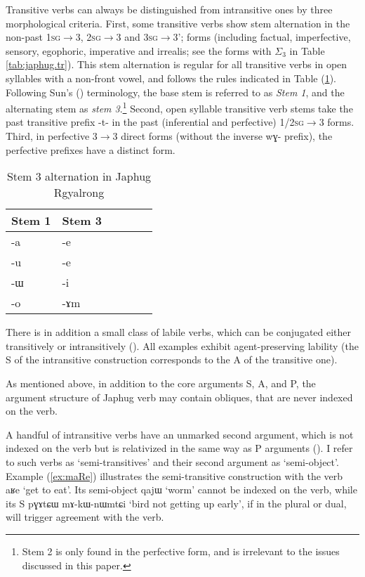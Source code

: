 \documentclass[oldfontcommands,oneside,a4paper,11pt]{article}
\newcommand{\ipa}[1]{{\phon \mbox{#1}}} %
\newcommand{\refb}[1]{(\ref{#1})}
\newcommand{\sigc}{$\Sigma_3$}
\begin{document}
Transitive verbs can always be distinguished from intransitive ones by three morphological criteria. First, some transitive verbs show stem alternation in the non-past \textsc{1sg}$\rightarrow$3, \textsc{2sg}$\rightarrow$3 and \textsc{3sg}$\rightarrow$3'; forms (including factual, imperfective, sensory, egophoric, imperative and irrealis; see the forms with \sigc{} in Table \ref{tab:japhug.tr}). This stem alternation is regular for all transitive verbs in open syllables with a non-front vowel, and follows the rules indicated  in Table \refb{tab:stem3}. Following Sun's (\citeyear{jackson00puxi}) terminology, the base stem is referred to as \textit{Stem 1}, and the alternating stem as \textit{stem 3}.\footnote{Stem 2 is only found in the perfective form, and is irrelevant to the issues discussed in this paper.}  Second, open syllable transitive verb stems take the past transitive prefix \ipa{-t-} in the past (inferential and perfective) \textsc{1/2sg}$\rightarrow$3 forms.  Third, in perfective 3$\rightarrow$3 direct forms (without the inverse \ipa{wɣ-} prefix), the perfective prefixes have a distinct form.

 \begin{table}[H]
\caption{Stem 3 alternation in Japhug Rgyalrong} \label{tab:stem3} \centering
\begin{tabular}{llllll}
\toprule
Stem 1 & Stem 3 \\
\midrule
\ipa{-a} & \ipa{-e} \\
\ipa{-u} & \ipa{-e} \\
\ipa{-ɯ} & \ipa{-i} \\
\ipa{-o} & \ipa{-ɤm} \\
\bottomrule
\end{tabular}
\end{table}

There is in addition a small class of labile verbs, which can be conjugated either transitively or intransitively (\citealt{jacques12demotion}). All examples exhibit agent-preserving  lability (the S of the intransitive construction corresponds to the A of the transitive one).
  
As mentioned above, in addition to the core arguments S, A, and P, the argument structure of Japhug verb may contain obliques, that are never indexed on the verb.
  
A handful of intransitive verbs have an unmarked second argument, which is not indexed on the verb but is relativized in the same way as P arguments (\citealt{jacques16relatives}). I refer to such verbs as `semi-transitives' and their second argument as `semi-object'.  Example \refb{ex:maRe} illustrates the semi-transitive construction with the verb \ipa{aʁe} `get to eat'. Its semi-object \ipa{qajɯ} `worm' cannot be indexed on the verb, while its S \ipa{pɣɤtɕɯ}  	\ipa{mɤ-kɯ-nɯmtɕi}  `bird not getting up early', if in the plural or dual, will trigger agreement with the verb.
  
\end{document}
